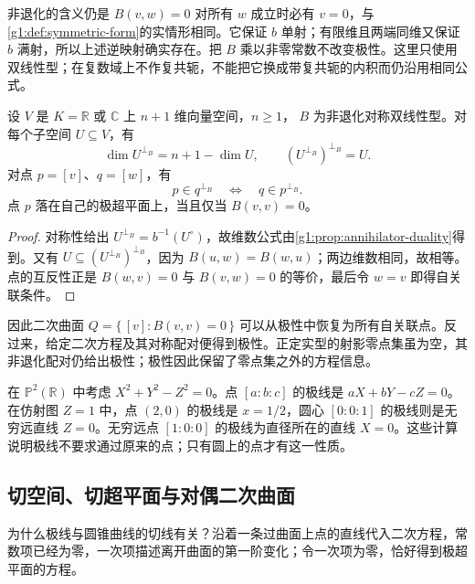 非退化的含义仍是 \(B(v,w)=0\) 对所有 \(w\) 成立时必有 \(v=0\)，与\cref{g1:def:symmetric-form}的实情形相同。它保证 \(b\) 单射；有限维且两端同维又保证 \(b\) 满射，所以上述逆映射确实存在。把 \(B\) 乘以非零常数不改变极性。这里只使用双线性型；在复数域上不作复共轭，不能把它换成带复共轭的内积而仍沿用相同公式。

\begin{proposition}\label{g1:prop:polarity}
	设 \(V\) 是 \(K=\mathbb R\) 或 \(\mathbb C\) 上 \(n+1\) 维向量空间，\(n\ge1\)， \(B\) 为非退化对称双线性型。对每个子空间 \(U\subseteq V\)，有
	\[
		\dim U^{\perp_B}=n+1-\dim U,\qquad
		(U^{\perp_B})^{\perp_B}=U.
	\]
	对点 \(p=[v]\)、\(q=[w]\)，有
	\[
		p\in q^{\perp_B}\quad\Longleftrightarrow\quad q\in p^{\perp_B}.
	\]
	点 \(p\) 落在自己的极超平面上，当且仅当 \(B(v,v)=0\)。
\end{proposition}
\begin{proof}
	对称性给出 \(U^{\perp_B}=b^{-1}(U^\circ)\)，故维数公式由\cref{g1:prop:annihilator-duality}得到。又有 \(U\subseteq(U^{\perp_B})^{\perp_B}\)，因为 \(B(u,w)=B(w,u)\)；两边维数相同，故相等。点的互反性正是 \(B(w,v)=0\) 与 \(B(v,w)=0\) 的等价，最后令 \(w=v\) 即得自关联条件。
\end{proof}

因此二次曲面 \(Q=\{\,[v]:B(v,v)=0\,\}\) 可以从极性中恢复为所有自关联点。反过来，给定二次方程及其对称配对便得到极性。正定实型的射影零点集虽为空，其非退化配对仍给出极性；极性因此保留了零点集之外的方程信息。

\begin{example}\label{g1:exm:circle-polar}
	在 \(\mathbb P^2(\mathbb R)\) 中考虑 \(X^2+Y^2-Z^2=0\)。点 \([a:b:c]\) 的极线是 \(aX+bY-cZ=0\)。在仿射图 \(Z=1\) 中，点 \((2,0)\) 的极线是 \(x=1/2\)，圆心 \([0:0:1]\) 的极线则是无穷远直线 \(Z=0\)。无穷远点 \([1:0:0]\) 的极线为直径所在的直线 \(X=0\)。这些计算说明极线不要求通过原来的点；只有圆上的点才有这一性质。
\end{example}

\subsection{切空间、切超平面与对偶二次曲面}
\label{g1:subsec:0204:03}

为什么极线与圆锥曲线的切线有关？沿着一条过曲面上点的直线代入二次方程，常数项已经为零，一次项描述离开曲面的第一阶变化；令一次项为零，恰好得到极超平面的方程。

